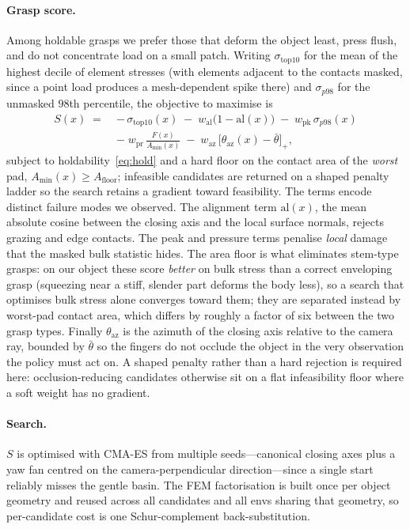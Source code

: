 \paragraph{Grasp score.}
Among holdable grasps we prefer those that deform the object least, press flush, and do not
concentrate load on a small patch. Writing $\sigma_{\text{top10}}$ for the mean of the
highest decile of element stresses (with elements adjacent to the contacts masked, since a
point load produces a mesh-dependent spike there) and $\sigma_{p98}$ for the unmasked $98$th
percentile, the objective to maximise is
\begin{equation}
  \begin{aligned}
  S(x) \;=\; &-\,\sigma_{\text{top10}}(x)
              \;-\; w_{\text{al}}\bigl(1-\mathrm{al}(x)\bigr)
              \;-\; w_{\text{pk}}\,\sigma_{p98}(x) \\[2pt]
             &-\; w_{\text{pr}}\,\frac{F(x)}{A_{\min}(x)}
              \;-\; w_{\text{az}}\,\bigl[\theta_{\text{az}}(x)-\bar\theta\bigr]_{+},
  \end{aligned}
  \label{eq:score}
\end{equation}
subject to holdability~\eqref{eq:hold} and a hard floor on the contact area of the
\emph{worst} pad, $A_{\min}(x) \ge A_{\text{floor}}$; infeasible candidates are returned on a
shaped penalty ladder so the search retains a gradient toward feasibility. The terms encode
distinct failure modes we observed. The alignment term $\mathrm{al}(x)$, the mean absolute
cosine between the closing axis and the local surface normals, rejects grazing and edge
contacts. The peak and pressure terms penalise \emph{local} damage that the masked bulk
statistic hides. The area floor is what eliminates stem-type grasps: on our object these
score \emph{better} on bulk stress than a correct enveloping grasp (squeezing near a stiff,
slender part deforms the body less), so a search that optimises bulk stress alone converges
toward them; they are separated instead by worst-pad contact area, which differs by roughly
a factor of six between the two grasp types. Finally $\theta_{\text{az}}$ is the azimuth of
the closing axis relative to the camera ray, bounded by $\bar\theta$ so the fingers do not
occlude the object in the very observation the policy must act on. A shaped penalty rather
than a hard rejection is required here: occlusion-reducing candidates otherwise sit on a flat
infeasibility floor where a soft weight has no gradient.

\paragraph{Search.}
$S$ is optimised with CMA-ES from multiple seeds---canonical closing axes plus a yaw fan
centred on the camera-perpendicular direction---since a single start reliably misses the
gentle basin. The FEM factorisation is built once per object geometry and reused across all
candidates and all envs sharing that geometry, so per-candidate cost is one Schur-complement
back-substitution.

